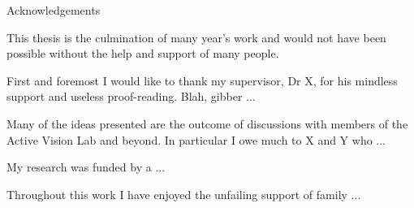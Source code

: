 \vspace*{20mm}
{
\Large\bf
\begin{center}
Acknowledgements
\end{center}
}


This thesis is the culmination of many year's work and would not have
been possible without the help and support of many
people. 

First and foremost I would like to thank my supervisor,
Dr X, for his mindless support and useless proof-reading.
Blah, gibber ...

Many of the ideas presented are the outcome of discussions
with members of the Active Vision Lab and beyond. In particular I owe
much to X and Y who ...

My research was funded by a ...

Throughout this work I have enjoyed the unfailing support of
family ...

